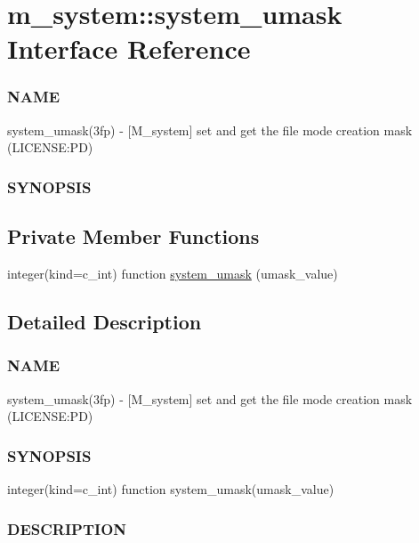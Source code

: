 \hypertarget{interfacem__system_1_1system__umask}{}\section{m\+\_\+system\+:\+:system\+\_\+umask Interface Reference}
\label{interfacem__system_1_1system__umask}


\subsubsection*{N\+A\+ME}

system\+\_\+umask(3fp) -\/ \mbox{[}M\+\_\+system\mbox{]} set and get the file mode creation mask (L\+I\+C\+E\+N\+SE\+:PD) \subsubsection*{S\+Y\+N\+O\+P\+S\+IS} 


\subsection*{Private Member Functions}
\begin{DoxyCompactItemize}
\item 
integer(kind=c\+\_\+int) function \mbox{\hyperlink{interfacem__system_1_1system__umask_a10fa518062761065afc422f100ed0a76}{system\+\_\+umask}} (umask\+\_\+value)
\end{DoxyCompactItemize}


\subsection{Detailed Description}
\subsubsection*{N\+A\+ME}

system\+\_\+umask(3fp) -\/ \mbox{[}M\+\_\+system\mbox{]} set and get the file mode creation mask (L\+I\+C\+E\+N\+SE\+:PD) \subsubsection*{S\+Y\+N\+O\+P\+S\+IS}

integer(kind=c\+\_\+int) function system\+\_\+umask(umask\+\_\+value)

\subsubsection*{D\+E\+S\+C\+R\+I\+P\+T\+I\+ON}

